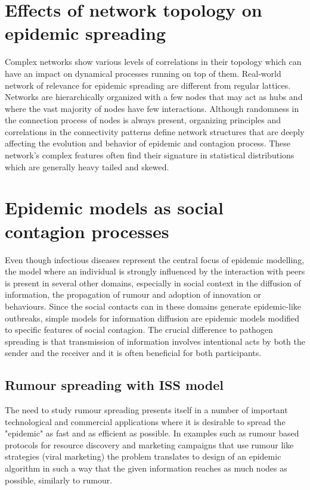 \documentclass[times, utf8, diplomski]{fer}
\begin{document}
\section{Effects of network topology on epidemic spreading}
Complex networks show various levels of correlations in their topology which can have an impact on dynamical processes running on top of them. 
Real-world network of relevance for epidemic spreading are different from regular lattices. Networks are hierarchically organized with a few nodes that may act as hubs and where the vast majority of nodes have few interactions. Although randomness in the connection process of nodes is always present, organizing principles and correlations in the connectivity patterns define network structures that are deeply affecting the evolution and behavior of epidemic and contagion process. These network's complex features often find their signature in statistical distributions which are generally heavy tailed and skewed.

\section{Epidemic models as social contagion processes}
Even though infectious diseases represent the central focus of epidemic modelling, the model where an individual is strongly influenced by the interaction with peers is present in several other domains, especially in social context in the diffusion of information, the propagation of rumour and adoption of innovation or behaviours.  Since the social contacts can in these domains generate epidemic-like outbreaks, simple models for information diffusion are epidemic models modified to specific features of social contagion. The crucial difference to pathogen spreading is that transmission of information involves intentional acts by both the sender and the receiver and it is often beneficial for both participants.

\subsection{Rumour spreading with ISS model}
The need to study rumour spreading presents itself in a number of important technological and commercial applications where it is desirable to spread the "epidemic" as fast and as efficient as possible.  In examples such as rumour based protocols for resource discovery and marketing campaigns that use rumour like strategies (viral marketing)  the problem translates to design of an epidemic algorithm in such a way that the given information reaches as much nodes as possible, similarly to rumour.
 
\end{document}
